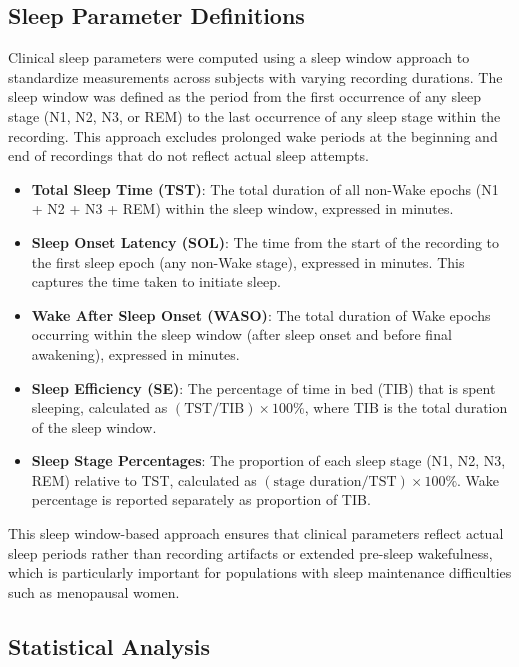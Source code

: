 \documentclass[ASNA,twocolumn]{USG}
\begin{document}
\subsection{Sleep Parameter Definitions}

Clinical sleep parameters were computed using a sleep window approach to standardize measurements across subjects with varying recording durations. The sleep window was defined as the period from the first occurrence of any sleep stage (N1, N2, N3, or REM) to the last occurrence of any sleep stage within the recording. This approach excludes prolonged wake periods at the beginning and end of recordings that do not reflect actual sleep attempts.

\begin{itemize}
\item \textbf{Total Sleep Time (TST)}: The total duration of all non-Wake epochs (N1 + N2 + N3 + REM) within the sleep window, expressed in minutes.
\item \textbf{Sleep Onset Latency (SOL)}: The time from the start of the recording to the first sleep epoch (any non-Wake stage), expressed in minutes. This captures the time taken to initiate sleep.
\item \textbf{Wake After Sleep Onset (WASO)}: The total duration of Wake epochs occurring within the sleep window (after sleep onset and before final awakening), expressed in minutes.
\item \textbf{Sleep Efficiency (SE)}: The percentage of time in bed (TIB) that is spent sleeping, calculated as $(\text{TST} / \text{TIB}) \times 100\%$, where TIB is the total duration of the sleep window.
\item \textbf{Sleep Stage Percentages}: The proportion of each sleep stage (N1, N2, N3, REM) relative to TST, calculated as $(\text{stage duration} / \text{TST}) \times 100\%$. Wake percentage is reported separately as proportion of TIB.
\end{itemize}

This sleep window-based approach ensures that clinical parameters reflect actual sleep periods rather than recording artifacts or extended pre-sleep wakefulness, which is particularly important for populations with sleep maintenance difficulties such as menopausal women.

\subsection{Statistical Analysis}
\end{document}

